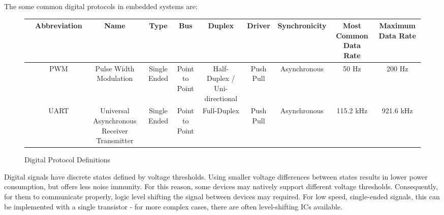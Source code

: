 \documentclass[main.tex]{subfiles}
\begin{document}
The some common digital protocols in embedded systems are:
\begin{figure}[h!]
    \centering
    \begin{tabular}{|c|c|c|c|c|c|c|c|c|c|}
        \hline 
        & Abbreviation & Name & Type & Bus & Duplex & Driver & Synchronicity & Most Common Data Rate & Maximum Data Rate \\ \hline
        & PWM & Pulse Width Modulation & Single Ended & Point to Point & Half-Duplex / Uni-directional & Push Pull & Asynchronous & 50 Hz & 200 Hz \\ \hline
        & UART & Universal Asynchronous Receiver Transmitter & Single Ended & Point to Point & Full-Duplex & Push Pull & Asynchronous & 115.2 kHz & 921.6 kHz \\ \hline



    \end{tabular}
    \caption{Digital Protocol Definitions}
    \label{fig:digital_protocols}
\end{figure}

\noindent Digital signals have discrete states defined by voltage thresholds. Using smaller voltage differences between states results in lower power consumption, but offers less noise immunity. For this reason, some devices may natively support different voltage thresholds. Consequently, for them to communicate properly, logic level shifting the signal between devices may required. For low speed, single-ended signals, this can be implemented with a single transistor - for more complex cases, there are often level-shifting ICs available. 

\end{document}
